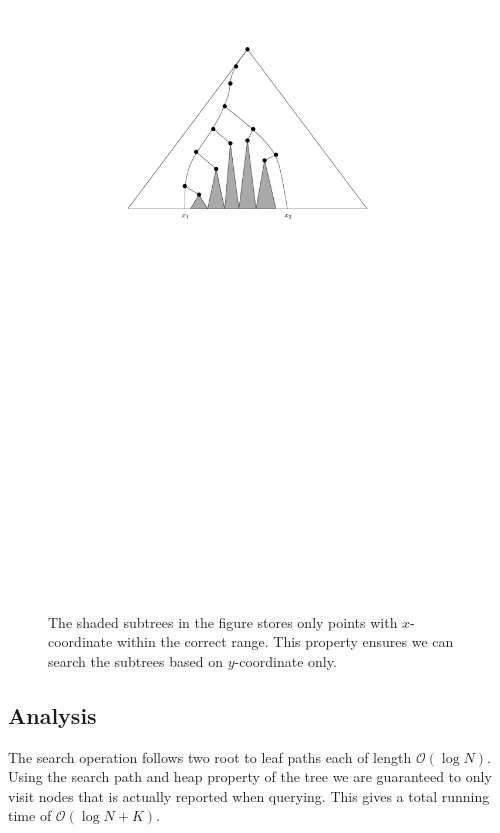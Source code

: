 \documentclass[twoside,11pt,openright]{report}
\begin{document}
\begin{figure}[h]
	\centering
	\includegraphics[scale=0.7]{../figures/internal_pst_query}
	\caption{The shaded subtrees in the figure stores only points with $x$-coordinate within the correct range. This property ensures we can search the subtrees based on $y$-coordinate only.}
	\label{fig:static_pst_query}
\end{figure}

\subsection*{Analysis}
The search operation follows two root to leaf paths each of length $\mathcal{O}(\log N)$. Using the search path and heap property of the tree we are guaranteed to only visit nodes that is actually reported when querying. This gives a total running time of $\mathcal{O}(\log N + K)$.
\end{document}
